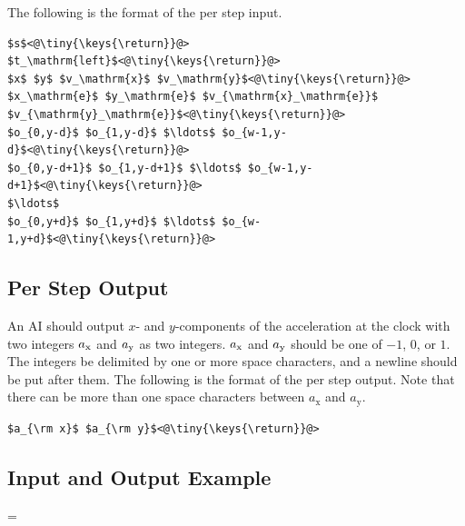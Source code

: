 \documentclass[11pt]{article}
\begin{document}
\noindent
The following is the format of the per step input.

\begin{lstlisting}
$s$<@\tiny{\keys{\return}}@>
$t_\mathrm{left}$<@\tiny{\keys{\return}}@>
$x$ $y$ $v_\mathrm{x}$ $v_\mathrm{y}$<@\tiny{\keys{\return}}@>
$x_\mathrm{e}$ $y_\mathrm{e}$ $v_{\mathrm{x}_\mathrm{e}}$ $v_{\mathrm{y}_\mathrm{e}}$<@\tiny{\keys{\return}}@>
$o_{0,y-d}$ $o_{1,y-d}$ $\ldots$ $o_{w-1,y-d}$<@\tiny{\keys{\return}}@>
$o_{0,y-d+1}$ $o_{1,y-d+1}$ $\ldots$ $o_{w-1,y-d+1}$<@\tiny{\keys{\return}}@>
$\ldots$
$o_{0,y+d}$ $o_{1,y+d}$ $\ldots$ $o_{w-1,y+d}$<@\tiny{\keys{\return}}@>
\end{lstlisting}

\subsection{Per Step Output}\label{sec:output_step}
An AI should output $x$- and $y$-components of the
acceleration at the clock with two integers $a_{\rm x}$ and $a_{\rm
  y}$ as two integers.
$a_{\rm x}$ and $a_{\rm y}$ should be one of $-1$, $0$, or $1$.
The integers be delimited by one or more space characters, and a newline should be put after them.
The following is the format of the per step output.
Note that there can be more than one space characters between $a_\mathrm{x}$ and $a_\mathrm{y}$.

\begin{lstlisting}
$a_{\rm x}$ $a_{\rm y}$<@\tiny{\keys{\return}}@>
\end{lstlisting}

\subsection{Input and Output Example}

\newlength{}
{}=\parindent
\end{document}
